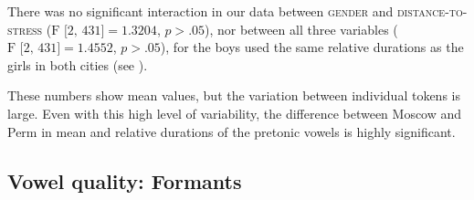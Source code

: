 \documentclass[output=paper,colorlinks,citecolor=black]{langscibook}
\begin{document}
There was no significant interaction in our data between \textsc{gender} and \textsc{distance-to-stress} ($\text{F [2, 431]} = 1.3204$, $p > .05$), nor between all three variables ($\text{F [2, 431]} = 1.4552$, $p > .05$), for the boys used the same relative durations as the girls in both cities (see \citealt{Post2024}).

These numbers show mean values, but the variation between individual tokens is large. Even with this high level of variability, the difference between Moscow and Perm in mean and relative durations of the pretonic vowels is highly significant.


\subsection{Vowel quality: Formants}
\largerpage
{}\tMoscow

\tPerm
\end{document}
